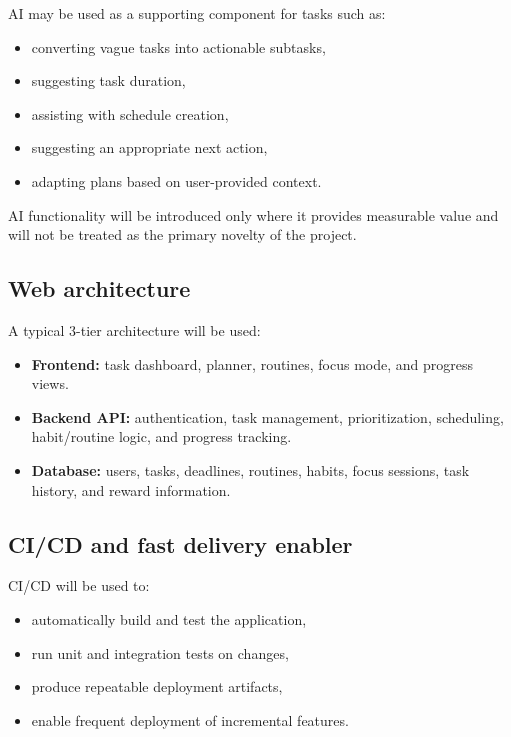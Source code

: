 \documentclass[11pt,a4paper]{article}
\begin{document}
AI may be used as a supporting component for tasks such as:

\begin{itemize}[leftmargin=0.7cm]
    \item converting vague tasks into actionable subtasks,
    \item suggesting task duration,
    \item assisting with schedule creation,
    \item suggesting an appropriate next action,
    \item adapting plans based on user-provided context.
\end{itemize}

AI functionality will be introduced only where it provides measurable
value and will not be treated as the primary novelty of the project.

\subsection{Web architecture}

A typical 3-tier architecture will be used:

\begin{itemize}[leftmargin=0.7cm]
    \item \textbf{Frontend:} task dashboard, planner, routines, focus mode,
    and progress views.
    
    \item \textbf{Backend API:} authentication, task management,
    prioritization, scheduling, habit/routine logic, and progress tracking.
    
    \item \textbf{Database:} users, tasks, deadlines, routines, habits,
    focus sessions, task history, and reward information.
\end{itemize}

\subsection{CI/CD and fast delivery enabler}

CI/CD will be used to:

\begin{itemize}[leftmargin=0.7cm]
    \item automatically build and test the application,
    \item run unit and integration tests on changes,
    \item produce repeatable deployment artifacts,
    \item enable frequent deployment of incremental features.
\end{itemize}
\end{document}
